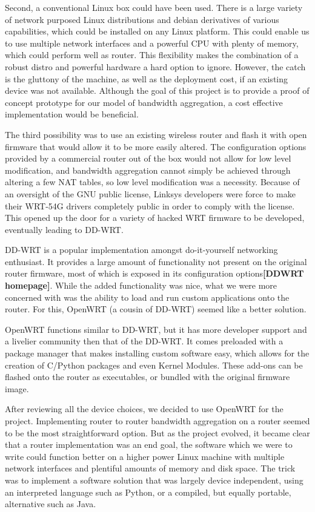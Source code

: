\documentclass[12pt]{article}
\newcommand{\lcite}[1]
{{\bfseries\color{orange}[#1]}}
\begin{document}
		Second, a conventional Linux box could have been used. There is a large variety of network purposed Linux distributions and debian derivatives of various capabilities, which could be installed on any Linux platform. This could enable us to use multiple network interfaces and a powerful CPU with plenty of memory, which could perform well as router. This flexibility makes the combination of a robust distro and powerful hardware a hard option to ignore. However, the catch is the gluttony of the machine, as well as the deployment cost, if an existing device was not available. Although the goal of this project is to provide a proof of concept prototype for our model of bandwidth aggregation, a cost effective implementation would be beneficial. 

		The third possibility was to use an existing wireless router and flash it with open firmware that would allow it to be more easily altered. The configuration options provided by a commercial router out of the box would not allow for low level modification, and bandwidth aggregation cannot simply be achieved through altering a few NAT tables, so low level modification was a necessity. Because of an oversight of the GNU public license, Linksys developers were force to make their WRT-54G drivers completely public in order to comply with the license. This opened up the door for a variety of hacked WRT firmware to be developed, eventually leading to DD-WRT. 

		DD-WRT is a popular implementation amongst do-it-yourself networking enthusiast. It provides a large amount of functionality not present on the original router firmware, most of which is exposed in its configuration options\lcite{DDWRT homepage}. While the added functionality was nice, what we were more concerned with was the ability to load and run custom applications onto the router. For this, OpenWRT (a cousin of DD-WRT) seemed like a better solution. 

		OpenWRT functions similar to DD-WRT, but it has more developer support and a livelier community then that of the DD-WRT. It comes preloaded with a package manager that makes installing custom software easy, which allows for the creation of C/Python packages and even Kernel Modules. These add-ons can be flashed onto the router as executables, or bundled with the original firmware image. 

		After reviewing all the device choices, we decided to use OpenWRT for the project. Implementing router to router bandwidth aggregation on a router seemed to be the most straightforward option. But as the project evolved, it became clear that a router implementation was an end goal, the software which we were to write could function better on a higher power Linux machine with multiple network interfaces and plentiful amounts of memory and disk space. The trick was to implement a software solution that was largely device independent, using an interpreted language such as Python, or a compiled, but equally portable, alternative such as Java.
\end{document}
